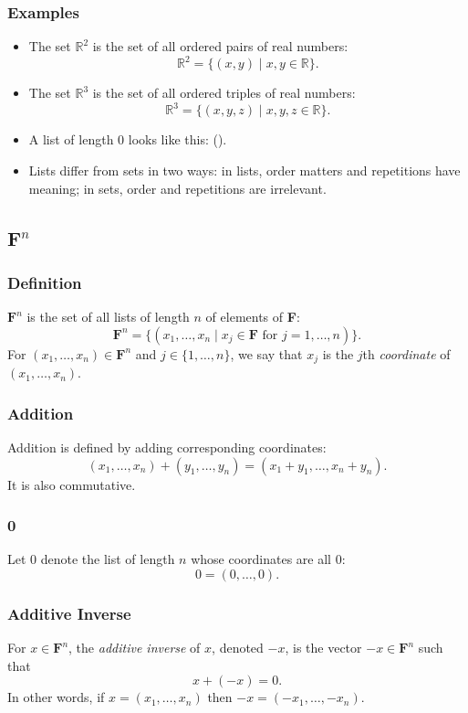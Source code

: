\documentclass[11pt]{article}
\begin{document}
    \subsubsection{Examples}
    \begin{itemize}
        \item The set \(\mathbb{R}^2\) is the set of all ordered pairs of real numbers: \[\mathbb{R}^2 = \{(x,y) \mid x,y \in \mathbb{R}\}.\]
        \item The set \(\mathbb{R}^3\) is the set of all ordered triples of real numbers: \[\mathbb{R}^3 = \{(x,y,z) \mid x,y,z \in \mathbb{R}\}.\]
        \item A list of length 0 looks like this: ().
        \item Lists differ from sets in two ways: in lists, order matters and repetitions have meaning; in sets, order and repetitions are irrelevant.
    \end{itemize}

    \subsection{\textbf{F}\(^n\)}

    \subsubsection{Definition}

    \(\textbf{F}^n\) is the set of all lists of length $n$ of elements of \textbf{F}: \[\textbf{F}^n = \{(x_1, \dots, x_n \mid x_j \in \textbf{F} \text{ for } j = 1, \dots, n)\}.\] For \((x_1, \dots, x_n) \in \textbf{F}^n\) and \(j \in \{1, \dots, n\}\), we say that \(x_j\) is the $j$th \emph{coordinate} of \((x_1, \dots, x_n).\)

    \subsubsection{Addition}
    Addition is defined by adding corresponding coordinates: \[(x_1, \dots, x_n) + (y_1, \dots, y_n) = (x_1 + y_1, \dots, x_n + y_n).\] It is also commutative.

    \subsubsection{0}
    Let 0 denote the list of length $n$ whose coordinates are all 0: \[0 = (0, \dots, 0).\]

    \subsubsection{Additive Inverse}
    For \(x \in \textbf{F}^n\), the \emph{additive inverse} of $x$, denoted $-x$, is the vector \(-x \in \textbf{F}^n\) such that \[x + (-x) = 0.\] In other words, if \(x = (x_1, \dots, x_n)\) then \(-x = (-x_1, \dots, -x_n).\)
\end{document}
